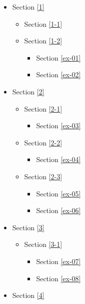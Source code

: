\documentclass[11pt]{article}
\providecommand{\tightlist}{%
      \setlength{\itemsep}{0pt}\setlength{\parskip}{0pt}}
\begin{document}
\begin{itemize}
\tightlist
\item
  Section \ref{1}

  \begin{itemize}
  \tightlist
  \item
    Section \ref{1-1}
  \item
    Section \ref{1-2}

    \begin{itemize}
    \tightlist
    \item
      Section \ref{ex-01}
    \item
      Section \ref{ex-02}
    \end{itemize}
  \end{itemize}
\item
  Section \ref{2}

  \begin{itemize}
  \tightlist
  \item
    Section \ref{2-1}

    \begin{itemize}
    \tightlist
    \item
      Section \ref{ex-03}
    \end{itemize}
  \item
    Section \ref{2-2}

    \begin{itemize}
    \tightlist
    \item
      Section \ref{ex-04}
    \end{itemize}
  \item
    Section \ref{2-3}

    \begin{itemize}
    \tightlist
    \item
      Section \ref{ex-05}
    \item
      Section \ref{ex-06}
    \end{itemize}
  \end{itemize}
\item
  Section \ref{3}

  \begin{itemize}
  \tightlist
  \item
    Section \ref{3-1}

    \begin{itemize}
    \tightlist
    \item
      Section \ref{ex-07}
    \item
      Section \ref{ex-08}
    \end{itemize}
  \end{itemize}
\item
  Section \ref{4}


\end{itemize}
\end{document}

